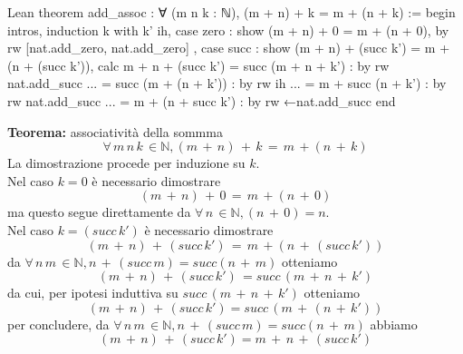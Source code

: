 \begin{code}{Lean}
theorem add_assoc : ∀ (m n k : ℕ), (m + n) + k = m + (n + k) :=
begin
  intros,
  induction k with k' ih,
    case zero : {
      show (m + n) + 0 = m + (n + 0), by 
        rw [nat.add_zero, nat.add_zero]
    },
    case succ : {
      show (m + n) + (succ k') = m + (n + (succ k')),
        calc
          m + n + (succ k') = succ (m + n + k') : 
            by rw nat.add_succ
          ...               = succ (m + (n + k')) : 
            by rw ih
          ...               = m + succ (n + k') : 
            by rw nat.add_succ
          ...               = m + (n + succ k') : 
            by rw ←nat.add_succ
    }
end
\end{code}
\begin{mdframed}[backgroundcolor=LightGray,linewidth=0]
\textbf{Teorema:} associatività della sommma
$$ \forall\,m\,n\,k\,\in \mathbb{N}, (m\,+\,n)\,+\,k\,=\,m\,+(n\,+\,k) $$
La dimostrazione procede per induzione su $k$. \\
Nel caso $k = 0$ è necessario dimostrare
$$(m\,+\,n)\,+\,0\,=\,m\,+(n\,+\,0)$$
ma questo segue direttamente da $\forall\,n\,\in \mathbb{N}, (n\,+\,0) = n$. \\
Nel caso $k = (succ\,k')$ è necessario dimostrare
$$(m\,+\,n)\,+\,(succ\,k')\,=\,m\,+(n\,+\,(succ\,k'))$$
da $\forall\,n\,m\,\in \mathbb{N}, n\,+\,(succ\,m) = succ(n\,+\,m)$ otteniamo
$$(m\,+\,n)\,+\,(succ\,k')\,=succ\,(m\,+\,n\,+\,k')$$
da cui, per ipotesi induttiva su $succ\,(m\,+\,n\,+\,k')$ otteniamo
$$(m\,+\,n)\,+\,(succ\,k') = succ\,(m\,+\,(n\,+\,k'))$$
per concludere, da $\forall\,n\,m\,\in \mathbb{N}, n\,+\,(succ\,m) = succ(n\,+\,m)$ abbiamo
$$(m\,+\,n)\,+\,(succ\,k') = m\,+\,n\,+\,(succ\,k')$$
\end{mdframed}